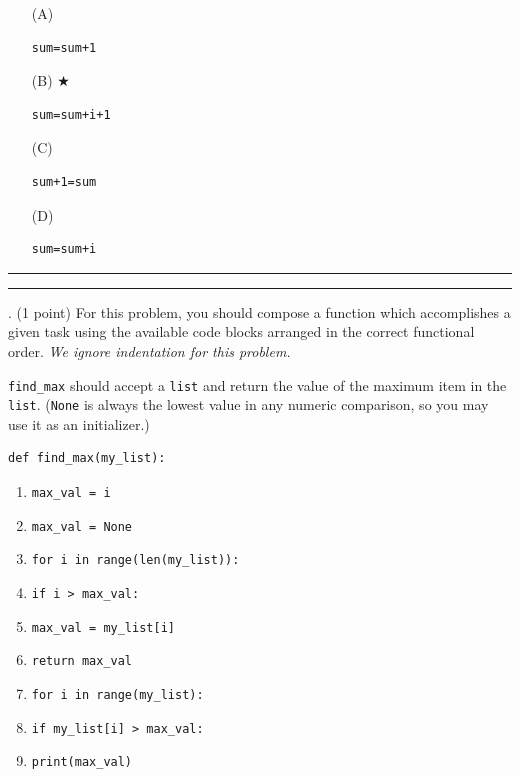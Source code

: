 \documentclass{article}
\begin{document}
\begin{enumerate}
\item[(A)]
\begin{verbatim}sum=sum+1\end{verbatim}

\item[(B)] $\bigstar$ 
\begin{verbatim}sum=sum+i+1 \end{verbatim}

\item[(C)]
\begin{verbatim}sum+1=sum \end{verbatim}

\item[(D)]
\begin{verbatim}sum=sum+i \end{verbatim}

\end{enumerate}

\vspace*{2em}
\hrule
\vspace{2em}

\vspace{2em}
\hrule height 2pt


\newpage
{}. (1 point)
For this problem, you should compose a function which accomplishes a given task using the available code blocks arranged in the correct functional order.  \emph{We ignore indentation for this problem.}

\texttt{find\_max} should accept a \texttt{list} and return the value of the maximum item in the \texttt{list}.  (\texttt{None} is always the lowest value in any numeric comparison, so you may use it as an initializer.)

\begin{verbatim}
def find_max(my_list):
\end{verbatim}

\begin{enumerate}[1]
\item \texttt{max\_val = i}
\item \texttt{max\_val = None}
\item \texttt{for i in range(len(my\_list)):}
\item \texttt{if i > max\_val:}
\item \texttt{max\_val = my\_list[i]}
\item \texttt{return max\_val}
\item \texttt{for i in range(my\_list):}
\item \texttt{if my\_list[i] > max\_val:}
\item \texttt{print(max\_val)}
\end{enumerate}
\end{document}
